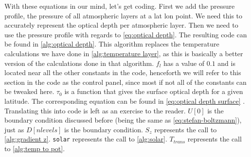 With these equations in our mind, let's get coding. First we add the pressure profile, the pressure of all atmospheric layers at a lat lon point. We need this to accurately represent the optical 
depth per atmospheric layer. Then we need to use the pressure profile with regards to \autoref{eq:optical depth}. The resulting code can be found in \autoref{alg:optical depth}. This algorithm 
replaces the temperature calculations we have done in \autoref{alg:temperature layer}, as this is basically a better version of the calculations done in that algorithm. $f_l$ has a value of $0.1$
and is located near all the other constants in the code, henceforth we will refer to this section in the code as the control panel, since most if not all of the constants can be tweaked here. 
$\tau_0$ is a function that gives the surface optical depth for a given latitude. The corresponding equation can be found in \autoref{eq:optical depth surface} \cite{simon}. Translating this 
into code is left as an exercise to the reader. $U[0]$ is the boundary condition discussed before (being the same as \autoref{eq:stefan-boltzmann}), just as $D[nlevels]$ is the boundary condition. 
$S_z$ represents the call to \autoref{alg:gradient z}. \texttt{solar} represents the call to \autoref{alg:solar}. $T_{trans}$ represents the call to \autoref{alg:temp to pot}.

